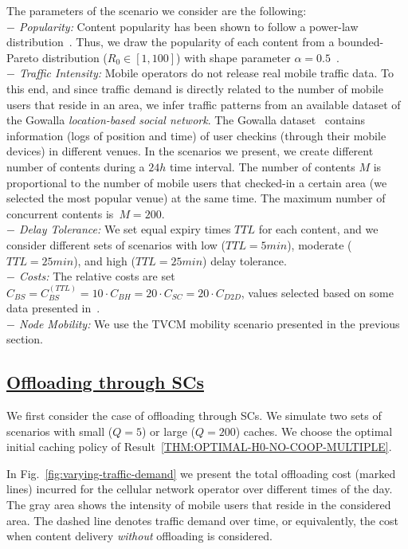 \documentclass[10pt,conference,letterpaper]{IEEEtran}
\begin{document}
\noindent The parameters of the scenario we consider are the following:\\
\textit{$-$ Popularity:} Content popularity has been shown to follow a power-law distribution~\cite{youtube-traffic-from-edge,top-video-cellular,pptv-mobile-vod}. Thus, we draw the popularity of each content from a bounded-Pareto distribution ($R_{0}\in[1, 100]$) with shape parameter $\alpha = 0.5$~\cite{youtube-traffic-from-edge}.\\
\textit{$-$ Traffic Intensity:} Mobile operators do not release real mobile traffic data. To this end, and since traffic demand is directly related to the number of mobile users that reside in an area, we infer traffic patterns from an available dataset of the Gowalla \textit{location-based social network}. The Gowalla dataset~\cite{Theus-comcom2012} contains information (logs of position and time) of user checkins (through their mobile devices) in different venues. In the scenarios we present, we create different number of contents during a $24h$ time interval. The number of contents $M$ is proportional to the number of mobile users that checked-in a certain area (we selected the most popular venue) at the same time. The maximum number of concurrent contents is~$M=200$.\\
\textit{$-$ Delay Tolerance:} We set equal expiry times $TTL$ for each content, and we consider different sets of scenarios with low ($TTL=5min$), moderate ($TTL=25min$), and high ($TTL=25min$) delay tolerance.\\
\textit{$-$ Costs:} The relative costs are set $C_{BS} = C_{BS}^{(TTL)} = 10\cdot C_{BH} = 20\cdot C_{SC}= 20\cdot C_{D2D}$, values selected based on some data presented in~\cite{johansson2007cost}.\\
\textit{$-$ Node Mobility:} We use the TVCM mobility scenario presented in the previous section.

\subsection*{\underline{Offloading through SCs}} 
We first consider the case of offloading through SCs. We simulate two sets of scenarios with small ($Q=5$) or large ($Q=200$) caches. We choose the optimal initial caching policy of Result~\ref{THM:OPTIMAL-H0-NO-COOP-MULTIPLE}.

In Fig.~\ref{fig:varying-traffic-demand} we present the total offloading cost (marked lines) incurred for the cellular network operator over different times of the day. The gray area shows the intensity of mobile users that reside in the considered area. The dashed line denotes traffic demand over time, or equivalently, the cost when content delivery \textit{without} offloading is considered.
\end{document}
